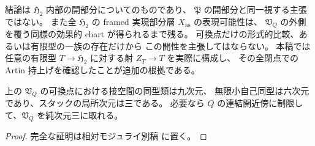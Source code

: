\begin{remark}[代数性について残る範囲]
結論は $\mathfrak H_2$ 内部の開部分についてのものであり、
$\mathfrak P$ の開部分と同一視する主張ではない。
また全 $\mathfrak H_2$ の framed 実現部分層 $X_{\mathrm{as}}$ の表現可能性は、
$\mathfrak V_Q$ の外側を覆う同様の効果的 chart が得られるまで残る。
可換点だけの形式的比較、あるいは有限型の一族の存在だけから
この開性を主張してはならない。
本稿では任意の有限型 $T\to\mathfrak H_2$ に対する射 $Z_T\to T$ を実際に構成し、
その全閉点での Artin 持上げを確認したことが追加の根拠である。
\end{remark}


\begin{corollary}[可換点の局所次元]
\label{cor:quadric-open-stack-dimension}
上の $\mathfrak V_Q$ の可換点における接空間の同型類は九次元、
無限小自己同型は六次元であり、スタックの局所次元は三である。
必要なら $Q$ の連結開近傍に制限して、$\mathfrak V_Q$ を純次元三に取れる。
\end{corollary}
\begin{proof}
完全な証明は相対モジュライ別稿 \cite[効果的foundationの滑らかな局所atlas]{QuadricModuli2026} に置く。
\end{proof}
